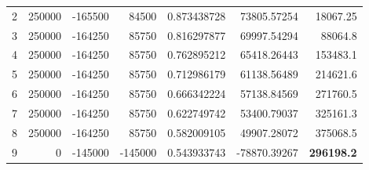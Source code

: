 \documentclass[12pt]{article}
\begin{document}
\begin{landscape}
\begin{table}[htbp]
\begin{tabular}{rrrrrrr}
    2     & 250000 & -165500 & 84500 & 0.873438728 & 73805.57254 & 18067.25 \\
    3     & 250000 & -164250 & 85750 & 0.816297877 & 69997.54294 & 88064.8 \\
    4     & 250000 & -164250 & 85750 & 0.762895212 & 65418.26443 & 153483.1 \\
    5     & 250000 & -164250 & 85750 & 0.712986179 & 61138.56489 & 214621.6 \\
    6     & 250000 & -164250 & 85750 & 0.666342224 & 57138.84569 & 271760.5 \\
    7     & 250000 & -164250 & 85750 & 0.622749742 & 53400.79037 & 325161.3 \\
    8     & 250000 & -164250 & 85750 & 0.582009105 & 49907.28072 & 375068.5 \\
    9     & 0     & -145000 & -145000 & 0.543933743 & -78870.39267 & \textbf{296198.2} \\
    \bottomrule
    \end{tabular}%
  \label{tab:addlabel}%
\end{table}%
\end{landscape}
\end{document}
